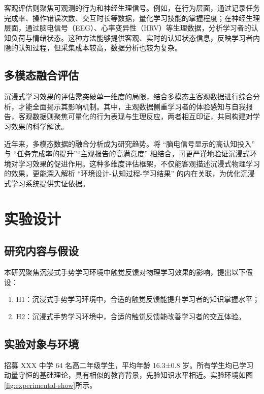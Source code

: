 \documentclass[runningheads]{llncs}
\begin{document}
客观评估则聚焦可观测的行为\cite{mayer2003nine}和神经生理信号。例如，在行为层面，通过记录任务完成率、操作错误次数、交互时长等数据，量化学习技能的掌握程度；在神经生理层面，通过脑电信号（EEG）、心率变异性（HRV）等生理数据，分析学习者的认知负荷与情绪状态。\cite{liu2023fusion,brugnera2016cortical,kobayashi2025pilot}这种方法能够提供客观、实时的认知状态信息，反映学习者内隐的认知过程，但采集成本较高，数据分析也较为复杂\cite{diarra2025systematic}。


\subsection{多模态融合评估}
沉浸式学习效果的评估需突破单一维度的局限，结合多模态主客观数据进行综合分析，才能全面揭示其影响机制\cite{tao2025learning,sharma2020multimodal}。其中，主观数据侧重学习者的体验感知与自我报告，客观数据则聚焦可量化的行为表现与生理反应，两者相互印证，共同构建对学习效果的科学解读\cite{dengel2018immersive}。

近年来，多模态数据的融合分析成为研究趋势。将 “脑电信号显示的高认知投入” 与 “任务完成率的提升”“主观报告的高满意度” 相结合，可更严谨地验证沉浸式环境对学习效果的促进作用\cite{DUBOVI2022104495}。这种多维度评估框架，不仅能客观描述沉浸式物理学习的效果，更能深入解析 “环境设计-认知过程-学习结果” 的内在关联，为优化沉浸式学习系统提供实证依据\cite{lindgren2016enhancing,liu2024behavioral}。

\section{实验设计}
\subsection{研究内容与假设}
本研究聚焦沉浸式手势学习环境中触觉反馈对物理学习效果的影响，提出以下假设：

\begin{enumerate}[label={$\bullet$}]
  \item H1：沉浸式手势学习环境中，合适的触觉反馈能提升学习者的知识掌握水平；
  \item H2：沉浸式手势学习环境中，合适的触觉反馈能改善学习者的交互体验。
\end{enumerate}

\subsection{实验对象与环境}

招募
XXX 中学 64 名高二年级学生，平均年龄 16.3±0.8 岁。所有学生均已学习动量守恒的基础理论，具有相似的教育背景，先验知识水平相近。实验环境如图\ref{fig:experimental-show}所示。
\end{document}
